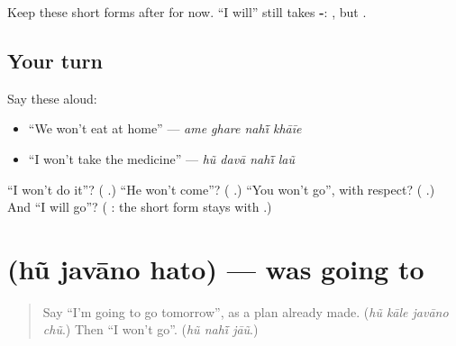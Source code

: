 Keep these short forms after \textbf{} for now. \textquotedblleft{}I will\textquotedblright{} still takes \textbf{-}: \textbf{ }, but \textbf{  }.

\subsection*{Your turn}
Say these aloud:

\begin{itemize}
\raggedright
  \item \textquotedblleft{}We won't eat at home\textquotedblright{} — \emph{ame ghare nahī̃ khāīe}
  \item \textquotedblleft{}I won't take the medicine\textquotedblright{} — \emph{hũ davā nahī̃ laũ}
\end{itemize}

\begin{tcolorbox}[breakable,colback=teal!4,colframe=teal!35!black,title={Before you move on}]
\textquotedblleft{}I won't do it\textquotedblright{}? (\textbf{  }.) \textquotedblleft{}He won't come\textquotedblright{}? (\textbf{  }.) \textquotedblleft{}You won't go\textquotedblright{}, with respect? (\textbf{  }.) And \textquotedblleft{}I will go\textquotedblright{}? (\textbf{ }: the short form stays with \textbf{}.)
\end{tcolorbox}
\section[\texorpdfstring{\gu{હું} \gu{જવાનો} \gu{હતો} (hũ javāno hato)}{હું જવાનો હતો (hũ javāno hato)}]{   (hũ javāno hato) — was going to}

\label{lesson:GU-C274-javano-hato}



\begin{quote}
Say \textquotedblleft{}I'm going to go tomorrow\textquotedblright{}, as a plan already made. (\emph{hũ kāle javāno chũ}.) Then \textquotedblleft{}I won't go\textquotedblright{}. (\emph{hũ nahī̃ jāũ}.)
\end{quote}


